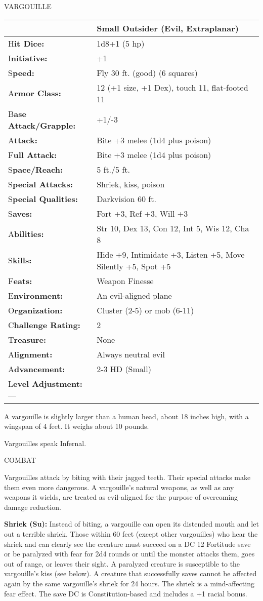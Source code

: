 \documentclass{article}
\begin{document}
\vspace{12pt}
{\LARGE{}VARGOUILLE}

\begin{tabular}{|>{\raggedright}p{91pt}|>{\raggedright}p{222pt}|}
\hline
  & Small Outsider (Evil, Extraplanar)\tabularnewline
\hline
H\textbf{it Dice:} & 1d8+1 (5 hp)\tabularnewline
\hline
I\textbf{nitiative:} & +1\tabularnewline
\hline
S\textbf{peed:} & Fly 30 ft. (good) (6 squares)\tabularnewline
\hline
A\textbf{rmor Class:} & 12 (+1 size, +1 Dex), touch 11, flat-footed 11\tabularnewline
\hline
B\textbf{ase Attack/Grapple:} & +1/-3\tabularnewline
\hline
A\textbf{ttack:} & Bite +3 melee (1d4 plus poison)\tabularnewline
\hline
F\textbf{ull Attack:} & Bite +3 melee (1d4 plus poison)\tabularnewline
\hline
S\textbf{pace/Reach:} & 5 ft./5 ft.\tabularnewline
\hline
S\textbf{pecial Attacks:} & Shriek, kiss, poison\tabularnewline
\hline
S\textbf{pecial Qualities:} & Darkvision 60 ft.\tabularnewline
\hline
S\textbf{aves:} & Fort +3, Ref +3, Will +3\tabularnewline
\hline
A\textbf{bilities:} & Str 10, Dex 13, Con 12, Int 5, Wis 12, Cha 8\tabularnewline
\hline
S\textbf{kills:} & Hide +9, Intimidate +3, Listen +5, Move Silently +5, Spot +5\tabularnewline
\hline
F\textbf{eats:} & Weapon Finesse\tabularnewline
\hline
E\textbf{nvironment:} & An evil-aligned plane\tabularnewline
\hline
O\textbf{rganization:} & Cluster (2-5) or mob (6-11)\tabularnewline
\hline
C\textbf{hallenge Rating:} & 2\tabularnewline
\hline
T\textbf{reasure:} & None\tabularnewline
\hline
A\textbf{lignment:} & Always neutral evil\tabularnewline
\hline
A\textbf{dvancement:} & 2-3 HD (Small)\tabularnewline
\hline
L\textbf{evel Adjustment:}--- & \tabularnewline
\hline
\end{tabular}

A vargouille is slightly larger than a human head, about 18 inches high, with a 
wingspan of 4 feet. It weighs about 10 pounds.

Vargouilles speak Infernal.

COMBAT

Vargouilles attack by biting with their jagged teeth. Their special attacks make 
them even more dangerous. A vargouille's natural weapons, as well as any weapons 
it wields, are treated as evil-aligned for the purpose of overcoming damage reduction.

\textbf{Shriek (Su):} Instead of biting, a vargouille can open its distended mouth 
and let out a terrible shriek. Those within 60 feet (except other vargouilles) 
who hear the shriek and can clearly see the creature must succeed on a DC 12 Fortitude 
save or be paralyzed with fear for 2d4 rounds or until the monster attacks them, 
goes out of range, or leaves their sight. A paralyzed creature is susceptible to 
the vargouille's kiss (see below). A creature that successfully saves cannot be 
affected again by the same vargouille's shriek for 24 hours. The shriek is a mind-affecting 
fear effect. The save DC is Constitution-based and includes a +1 racial bonus.
\end{document}
